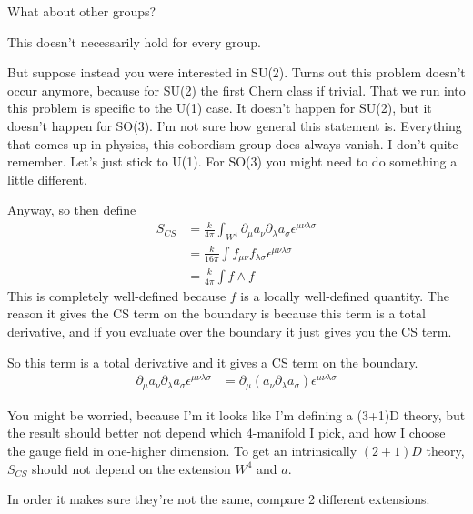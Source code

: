 \begin{question}
    What about other groups?
\end{question}
This doesn't necessarily hold for every group.

But suppose instead you were interested in SU(2).
Turns out this problem doesn't occur anymore,
because for SU(2) the first Chern class if trivial.
That we run into this problem is specific to the U(1) case.
It doesn't happen for SU(2),
but it doesn't happen for SO(3).
I'm not sure how general this statement is.
Everything that comes up in physics,
this cobordism group does always vanish.
I don't quite remember.
Let's just stick to U(1).
For SO(3) you might need to do something a little different.


Anyway, so then define
\begin{align}
    S_{CS} &=
    \frac{k}{4\pi}
    \int_{W^4} \partial_\mu a_\nu \partial_\lambda a_\sigma
    \epsilon^{\mu\nu\lambda\sigma}\\
    &=
    \frac{k}{16\pi}
    \int f_{\mu\nu} f_{\lambda\sigma} \epsilon^{\mu\nu\lambda\sigma}\\
    &=
    \frac{k}{4\pi} \int f\wedge f
\end{align}
This is completely well-defined because $f$ is a locally well-defined quantity.
The reason it gives the CS term on the boundary is because this term is a total
derivative,
and if you evaluate over the boundary it just gives you the CS term.

So this term is a total derivative and it gives a CS term on the boundary.
\begin{align}
    \partial_\mu a_\nu \partial_\lambda a_\sigma
    \epsilon^{\mu\nu\lambda\sigma}
    &=
    \partial_\mu\left( 
    a_\nu \partial_\lambda a_\sigma
    \right)
    \epsilon^{\mu\nu\lambda\sigma}
\end{align}

You might be worried,
because I'm it looks like I'm defining a (3+1)D theory,
but the result should better not depend which 4-manifold I pick,
and how I choose the gauge field in one-higher dimension.
To get an intrinsically $(2+1)D$ theory,
$S_{CS}$ should not depend on the extension $W^4$ and $a$.


In order it makes sure they're not the same,
compare 2 different extensions.


